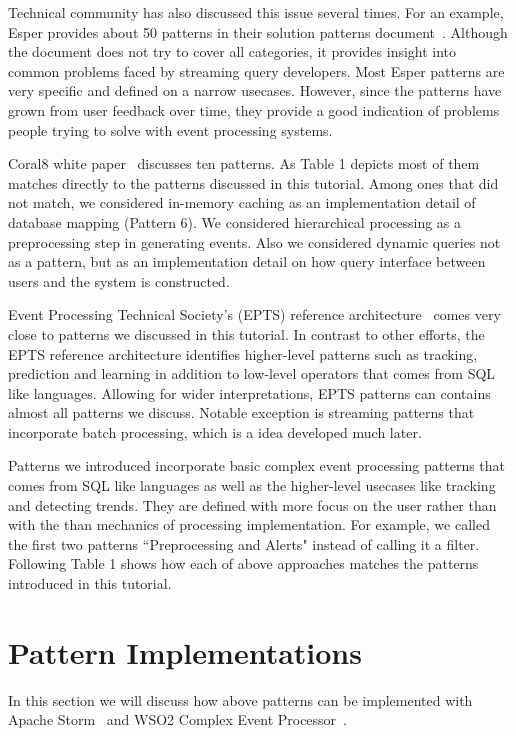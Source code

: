 \documentclass{sig-alternate}
\begin{document}
{Technical community has also discussed this issue several times. For an example, Esper provides about 50 patterns in their solution patterns document~\cite{esperPatterns}. Although the document does not try to cover all categories, it provides insight into common problems faced by streaming query developers. Most Esper patterns are very specific and defined on a narrow usecases. However, since the patterns have grown from user feedback over time, they provide a good indication of problems people trying to solve with event processing systems. 

Coral8 white paper~\cite{Coral810patterns} discusses ten patterns. As Table 1 depicts most of them matches directly to the patterns discussed in this tutorial. Among ones that did not match, we considered in-memory caching as an implementation detail of database mapping (Pattern 6). We considered hierarchical processing as a preprocessing step in generating events. Also we considered dynamic queries not as a pattern, but as an implementation detail on how query interface between users and the system is constructed. 

Event Processing Technical Society's (EPTS) reference architecture~\cite{eptsRefArch} comes very close to patterns we discussed in this tutorial. In contrast to other efforts, the EPTS reference architecture identifies higher-level patterns such as tracking, prediction and learning in addition to low-level operators that comes from SQL like languages. Allowing for wider interpretations, EPTS patterns can contains almost all patterns we discuss. Notable exception is streaming patterns that incorporate batch processing, which is a idea developed much later. 

Patterns we introduced incorporate basic complex event processing patterns that comes from SQL like languages as well as the higher-level usecases like tracking and detecting trends.  They are defined with more focus on the user rather than with the than mechanics of processing implementation. For example, we called the first two patterns ``Preprocessing and Alerts" instead of calling it a filter. Following Table 1 shows how each of above approaches matches the patterns introduced in this tutorial. 

\section{Pattern Implementations}  

In this section we will discuss how above patterns can be implemented with Apache Storm~\cite{storm} and WSO2 Complex Event Processor~\cite{siddhi}. 

}
\end{document}
